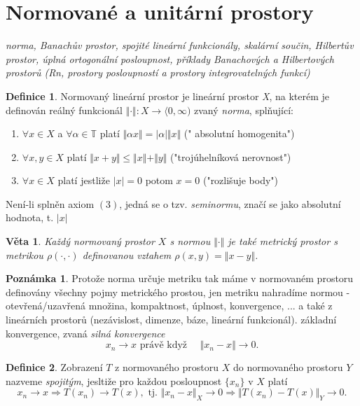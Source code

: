 \documentclass[a4]{report}
\newtheorem{theorem}{Věta}
\theoremstyle{definition}
\newtheorem{definition}{Definice}[section]
\newtheorem{notes}{Poznámka}[section]
\begin{document}
{\section{Normované a unitární prostory}
\textit{norma, Banachův prostor, spojité lineární funkcionály, skalární součin, Hilbertův prostor, úplná ortogonální posloupnost, příklady Banachových a Hilbertových prostorů (Rn, prostory posloupností a prostory integrovatelných funkcí)}
\\
\begin{definition}
Normovaný lineární prostor je lineární prostor \textit{X}, na kterém je definován reálný funkcionál $\Vert\cdot\Vert : X \rightarrow \langle 0,\infty )$ zvaný \textit{norma}, splňující:
\begin{enumerate}
\item  $\forall x \in X$ a $ \forall \alpha \in \mathbb{T}$ platí $  \Vert \alpha x \Vert = \vert \alpha \vert \Vert x \Vert$ (" absolutní homogenita")
\item $\forall x,y \in X $ platí $ \Vert x+y \Vert \leq \Vert x \Vert + \Vert y \Vert$ ("trojúhelníková nerovnost") 
\item $\forall x \in X$ platí jestliže $\vert x \vert =0$ potom $x=0$  ("rozlišuje body")
\end{enumerate}
Není-li splněn axiom $(3)$, jedná se o tzv. \textit{seminormu}, značí se jako absolutní hodnota, t. $\vert x \vert$ 
\end{definition}

\begin{theorem}
Každý normovaný prostor $X$ s normou $\Vert \cdot \Vert $ je také metrický prostor s metrikou $\rho(\cdot,\cdot)$ definovanou vztahem $\rho (x,y)= \Vert x-y \Vert$. 
\end{theorem}

\begin{notes}
Protože norma určuje metriku tak máme v normovaném prostoru definovány všechny pojmy metrického prostou, jen metriku nahradíme normou - otevřená/uzavřená množina, kompaktnost, úplnost, konvergence, ... a také z lineárních prostorů (nezávislost, dimenze, báze, lineární funkcionál).  základní konvergence, zvaná \textit{silná konvergence }
\begin{equation*}
	x_n \rightarrow x \text{  právě když } \quad \Vert x_n-x\Vert \rightarrow 0.
\end{equation*}
\end{notes}

\begin{definition}
	Zobrazení $T$ z normovaného prostoru $X$ do normovaného prostoru $Y$ nazveme \textit{spojitým}, jesltiže pro každou posloupnost $\{x_n \}$ v $X$ platí
	\begin{equation*}
		x_n\rightarrow x \Rightarrow T(x_n)\rightarrow T(x), \text{   tj.  } \Vert x_n -x \Vert_X \rightarrow 0 \Rightarrow \Vert T(x_n) - T(x)\Vert_Y \rightarrow 0.
	\end{equation*} 
\end{definition}


}
\end{document}
